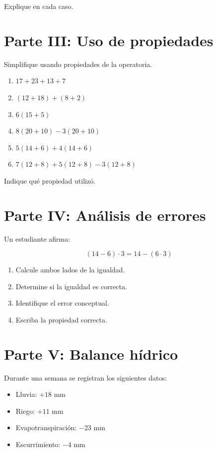 \documentclass[12pt]{article}
\begin{document}
	Explique en cada caso.
	
	\newpage
	
	\vspace*{2em}
	
	\section*{Parte III: Uso de propiedades}
	
	Simplifique usando propiedades de la operatoria.
	
	\begin{enumerate}
		\item $17 + 23 + 13 + 7$
		\item $(12 + 18) + (8 + 2)$
		\item $6(15 + 5)$
		\item $8(20 + 10) - 3(20 + 10)$
		\item $5(14 + 6) + 4(14 + 6)$
		\item $7(12 + 8) + 5(12 + 8) - 3(12 + 8)$
	\end{enumerate}
	
	Indique qué propiedad utilizó.
	
	\section*{Parte IV: Análisis de errores}
	
	Un estudiante afirma:
	
	\[
	(14 - 6)\cdot 3 = 14 - (6 \cdot 3)
	\]
	
	\begin{enumerate}
		\item Calcule ambos lados de la igualdad.
		\item Determine si la igualdad es correcta.
		\item Identifique el error conceptual.
		\item Escriba la propiedad correcta.
	\end{enumerate}
	
	\section*{Parte V: Balance hídrico}
	
	Durante una semana se registran los siguientes datos:
	
	\begin{itemize}
		\item Lluvia: $+18$ mm
		\item Riego: $+11$ mm
		\item Evapotranspiración: $-23$ mm
		\item Escurrimiento: $-4$ mm
	\end{itemize}
	
\end{document}
